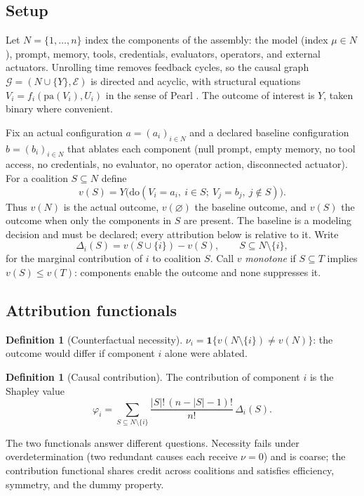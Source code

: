 \documentclass[11pt]{article}
\theoremstyle{definition}
\newtheorem{definition}[theorem]{Definition}
\begin{document}
\subsection{Setup}

Let $N=\{1,\dots,n\}$ index the components of the assembly: the model (index $\mu\in N$), prompt, memory, tools, credentials, evaluators, operators, and external actuators. Unrolling time removes feedback cycles, so the causal graph $\mathcal{G}=(N\cup\{Y\},\mathcal{E})$ is directed and acyclic, with structural equations $V_i=f_i(\mathrm{pa}(V_i),U_i)$ in the sense of Pearl \cite{pearl2009}. The outcome of interest is $Y$, taken binary where convenient.

Fix an actual configuration $a=(a_i)_{i\in N}$ and a declared baseline configuration $b=(b_i)_{i\in N}$ that ablates each component (null prompt, empty memory, no tool access, no credentials, no evaluator, no operator action, disconnected actuator). For a coalition $S\subseteq N$ define
\[
v(S)=Y\bigl(\mathrm{do}(V_i=a_i,\ i\in S;\ V_j=b_j,\ j\notin S)\bigr).
\]
Thus $v(N)$ is the actual outcome, $v(\varnothing)$ the baseline outcome, and $v(S)$ the outcome when only the components in $S$ are present. The baseline is a modeling decision and must be declared; every attribution below is relative to it. Write
\[
\Delta_i(S)=v(S\cup\{i\})-v(S),\qquad S\subseteq N\setminus\{i\},
\]
for the marginal contribution of $i$ to coalition $S$. Call $v$ \emph{monotone} if $S\subseteq T$ implies $v(S)\le v(T)$: components enable the outcome and none suppresses it.

\subsection{Attribution functionals}

\begin{definition}[Counterfactual necessity]
$\nu_i=\mathbf{1}\{v(N\setminus\{i\})\neq v(N)\}$: the outcome would differ if component $i$ alone were ablated.
\end{definition}

\begin{definition}[Causal contribution]
The contribution of component $i$ is the Shapley value \cite{shapley1953}
\[
\varphi_i=\sum_{S\subseteq N\setminus\{i\}}\frac{|S|!\,(n-|S|-1)!}{n!}\,\Delta_i(S).
\]
\end{definition}

The two functionals answer different questions. Necessity fails under overdetermination (two redundant causes each receive $\nu=0$) and is coarse; the contribution functional shares credit across coalitions and satisfies efficiency, symmetry, and the dummy property.
\end{document}
